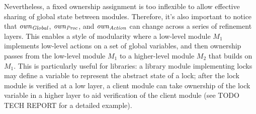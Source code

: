 Nevertheless, a fixed ownership assignment is too inflexible to allow effective sharing of global state between modules.
Therefore, it's also important to notice that $\mathit{own}_{\mathit{Global}}$, $\mathit{own}_{\mathit{Proc}}$, and $\mathit{own}_{\mathit{Action}}$ can change across a series of refinement layers.
This enables a style of modularity where a low-level module $M_1$ implements low-level actions on a set of global variables,
and then ownership passes from the low-level module $M_1$ to a higher-level module $M_2$ that builds on $M_1$.
This is particularly useful for libraries:
a library module implementing locks may define a variable to represent the abstract state of a lock;
after the lock module is verified at a low layer,
a client module can take ownership of the lock variable in a higher layer to aid verification of the client module
(see TODO TECH REPORT for a detailed example).
